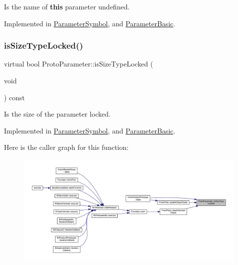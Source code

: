 Is the name of {\bfseries{this}} parameter undefined. 



Implemented in \mbox{\hyperlink{class_parameter_symbol_a6a2fd9c22592c3e7144b3eb3ff349fe6}{Parameter\+Symbol}}, and \mbox{\hyperlink{class_parameter_basic_a0385f1293c9dffdb691c479e7b82a239}{Parameter\+Basic}}.

\mbox{\label{class_proto_parameter_ad1a249d140c17d040845d0bcf8307fd0}} 
\subsubsection{\texorpdfstring{isSizeTypeLocked()}{isSizeTypeLocked()}}
{\footnotesize\ttfamily virtual bool Proto\+Parameter\+::is\+Size\+Type\+Locked (\begin{DoxyParamCaption}\item[{void}]{ }\end{DoxyParamCaption}) const\hspace{0.3cm}{\ttfamily [pure virtual]}}



Is the size of the parameter locked. 



Implemented in \mbox{\hyperlink{class_parameter_symbol_ab248a298389e7b04175de72a49275d31}{Parameter\+Symbol}}, and \mbox{\hyperlink{class_parameter_basic_ab8644a632a02193f26e4499bbfa7dbc9}{Parameter\+Basic}}.

Here is the caller graph for this function\+:
\nopagebreak
\begin{figure}[H]
\begin{center}
\leavevmode
\includegraphics[width=350pt]{class_proto_parameter_ad1a249d140c17d040845d0bcf8307fd0_icgraph}
\end{center}
\end{figure}
\mbox{\label{class_proto_parameter_a155b564b34ae0b36d39d5a1caf5d0014}} 
